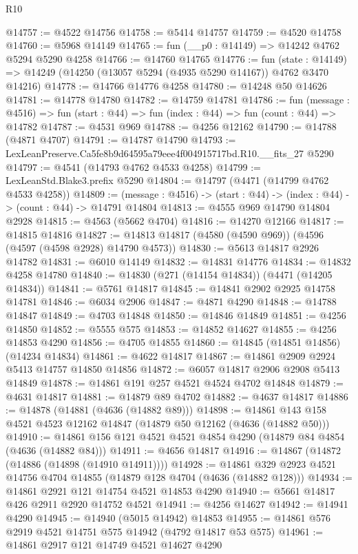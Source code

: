 \begin{lexlean}{R10}
\begin{coremodule}
@14757 := @4522 @14756
@14758 := @5414 @14757
@14759 := @4520 @14758
@14760 := @5968 @14149
@14765 := fun (__p0 : @14149) => @14242 @4762 @5294 @5290 @4258
@14766 := @14760 @14765
@14776 := fun (state : @14149) =>
  @14249 (@14250 (@13057 @5294 (@4935 @5290 @14167)) @4762 @3470 @14216)
@14778 := @14766 @14776 @4258
@14780 := @14248 @50 @14626
@14781 := @14778 @14780
@14782 := @14759 @14781
@14786 := fun (message : @4516) =>
  fun (start : @44) => fun (index : @44) => fun (count : @44) => @14782
@14787 := @4531 @969
@14788 := @4256 @12162
@14790 := @14788 (@4871 @4707)
@14791 := @14787 @14790
@14793 := LexLeanPreserve.Ca5fe8b9d64595a79eee4f004915717bd.R10.__fits_27 @5290
@14797 := @4541 (@14793 @4762 @4533 @4258)
@14799 := LexLeanStd.Blake3.prefix @5290
@14804 := @14797 (@4471 (@14799 @4762 @4533 @4258))
@14809 := (message : @4516) -> (start : @44) -> (index : @44) -> (count : @44) -> @14791 @14804
@14813 := @4555 @969 @14790 @14804 @2928
@14815 := @4563 (@5662 @4704)
@14816 := @14270 @12166
@14817 := @14815 @14816
@14827 := @14813 @14817 (@4580 (@4590 @969)) (@4596 (@4597 (@4598 @2928) @14790 @4573))
@14830 := @5613 @14817 @2926 @14782
@14831 := @6010 @14149
@14832 := @14831 @14776
@14834 := @14832 @4258 @14780
@14840 := @14830 (@271 (@14154 @14834)) (@4471 (@14205 @14834))
@14841 := @5761 @14817
@14845 := @14841 @2902 @2925 @14758 @14781
@14846 := @6034 @2906
@14847 := @4871 @4290
@14848 := @14788 @14847
@14849 := @4703 @14848
@14850 := @14846 @14849
@14851 := @4256 @14850
@14852 := @5555 @575
@14853 := @14852 @14627
@14855 := @4256 @14853 @4290
@14856 := @4705 @14855
@14860 := @14845 (@14851 @14856) (@14234 @14834)
@14861 := @4622 @14817
@14867 := @14861 @2909 @2924 @5413 @14757 @14850 @14856
@14872 := @6057 @14817 @2906 @2908 @5413 @14849
@14878 := @14861 @191 @257 @4521 @4524 @4702 @14848
@14879 := @4631 @14817
@14881 := @14879 @89 @4702
@14882 := @4637 @14817
@14886 := @14878 (@14881 (@4636 (@14882 @89)))
@14898 := @14861 @143 @158 @4521 @4523 @12162 @14847 (@14879 @50 @12162 (@4636 (@14882 @50)))
@14910 := @14861 @156 @121 @4521 @4521 @4854 @4290 (@14879 @84 @4854 (@4636 (@14882 @84)))
@14911 := @4656 @14817
@14916 := @14867 (@14872 (@14886 (@14898 (@14910 @14911))))
@14928 := @14861 @329 @2923 @4521 @14756 @4704 @14855 (@14879 @128 @4704 (@4636 (@14882 @128)))
@14934 := @14861 @2921 @121 @14754 @4521 @14853 @4290
@14940 := @5661 @14817 @426 @2911 @2920 @14752 @4521
@14941 := @4256 @14627
@14942 := @14941 @4290
@14945 := @14940 (@5015 @14942) @14853
@14955 := @14861 @576 @2919 @4521 @14751 @575 @14942 (@4792 @14817 @53 @575)
@14961 := @14861 @2917 @121 @14749 @4521 @14627 @4290

\end{coremodule}
\end{lexlean}
